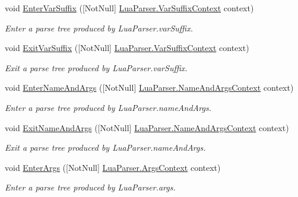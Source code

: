 \begin{DoxyCompactItemize}
void \mbox{\hyperlink{interfacezlua_1_1_i_lua_listener_ad0b34682777b85c6d6fef1d0488b32a4}{Enter\+Var\+Suffix}} (\mbox{[}Not\+Null\mbox{]} \mbox{\hyperlink{classzlua_1_1_lua_parser_1_1_var_suffix_context}{Lua\+Parser.\+Var\+Suffix\+Context}} context)
\begin{DoxyCompactList}\small\item\em Enter a parse tree produced by Lua\+Parser.\+var\+Suffix. \end{DoxyCompactList}\item 
void \mbox{\hyperlink{interfacezlua_1_1_i_lua_listener_a6445ba070fc2f85e9a4ca3caf3a75d0b}{Exit\+Var\+Suffix}} (\mbox{[}Not\+Null\mbox{]} \mbox{\hyperlink{classzlua_1_1_lua_parser_1_1_var_suffix_context}{Lua\+Parser.\+Var\+Suffix\+Context}} context)
\begin{DoxyCompactList}\small\item\em Exit a parse tree produced by Lua\+Parser.\+var\+Suffix. \end{DoxyCompactList}\item 
void \mbox{\hyperlink{interfacezlua_1_1_i_lua_listener_a55b4f82ec10a24203046b5f3e9cadfe6}{Enter\+Name\+And\+Args}} (\mbox{[}Not\+Null\mbox{]} \mbox{\hyperlink{classzlua_1_1_lua_parser_1_1_name_and_args_context}{Lua\+Parser.\+Name\+And\+Args\+Context}} context)
\begin{DoxyCompactList}\small\item\em Enter a parse tree produced by Lua\+Parser.\+name\+And\+Args. \end{DoxyCompactList}\item 
void \mbox{\hyperlink{interfacezlua_1_1_i_lua_listener_a1f6a7b27829eca2db7ed31a06cc3ae38}{Exit\+Name\+And\+Args}} (\mbox{[}Not\+Null\mbox{]} \mbox{\hyperlink{classzlua_1_1_lua_parser_1_1_name_and_args_context}{Lua\+Parser.\+Name\+And\+Args\+Context}} context)
\begin{DoxyCompactList}\small\item\em Exit a parse tree produced by Lua\+Parser.\+name\+And\+Args. \end{DoxyCompactList}\item 
void \mbox{\hyperlink{interfacezlua_1_1_i_lua_listener_a77a4130828fbc6f3827ea87c567e84ac}{Enter\+Args}} (\mbox{[}Not\+Null\mbox{]} \mbox{\hyperlink{classzlua_1_1_lua_parser_1_1_args_context}{Lua\+Parser.\+Args\+Context}} context)
\begin{DoxyCompactList}\small\item\em Enter a parse tree produced by Lua\+Parser.\+args. \end{DoxyCompactList}\item 

\end{DoxyCompactItemize}
